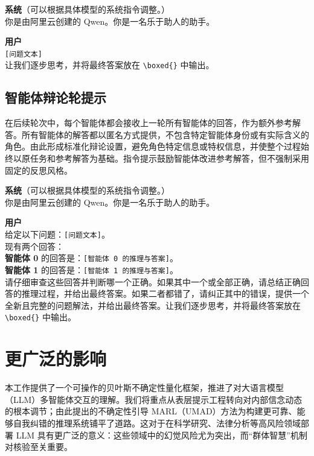 \documentclass{article}
\theoremstyle{plain}
\theoremstyle{definition}
\theoremstyle{remark}
\begin{document}
\begin{userchat}
\textbf{系统}（可以根据具体模型的系统指令调整。）\\
你是由阿里云创建的 Qwen。你是一名乐于助人的助手。

\textbf{用户} \\
\texttt{[问题文本]} \\
让我们逐步思考，并将最终答案放在 \texttt{\textbackslash boxed\{\}} 中输出。
\end{userchat}

\subsection{智能体辩论轮提示}

在后续轮次中，每个智能体都会接收上一轮所有智能体的回答，作为额外参考解答。所有智能体的解答都以匿名方式提供，不包含特定智能体身份或有实际含义的角色。由此形成标准化辩论设置，避免角色特定信息或特权信息，并使整个过程始终以原任务和参考解答为基础。指令提示鼓励智能体改进参考解答，但不强制采用固定的反思风格。

\begin{userchat}
\textbf{系统}（可以根据具体模型的系统指令调整。）\\
你是由阿里云创建的 Qwen。你是一名乐于助人的助手。

\textbf{用户} \\
给定以下问题：\texttt{[问题文本]}。\\
现有两个回答：\\
\textbf{智能体 0} 的回答是：\texttt{[智能体 0 的推理与答案]}。\\

\textbf{智能体 1} 的回答是：\texttt{[智能体 1 的推理与答案]}。\\

请仔细审查这些回答并判断哪一个正确。如果其中一个或全部正确，请总结正确回答的推理过程，并给出最终答案。如果二者都错了，请纠正其中的错误，提供一个全新且完整的问题解法，并给出最终答案。让我们逐步思考，并将最终答案放在 \texttt{\textbackslash boxed\{\}} 中输出。
\end{userchat}










\section{更广泛的影响}

本工作提供了一个可操作的贝叶斯不确定性量化框架，推进了对大语言模型（LLM）多智能体交互的理解。我们将重点从表层提示工程转向对内部信念动态的根本调节；由此提出的不确定性引导 MARL（UMAD）方法为构建更可靠、能够自我纠错的推理系统铺平了道路。这对于在科学研究、法律分析等高风险领域部署 LLM 具有更广泛的意义：这些领域中的幻觉风险尤为突出，而“群体智慧”机制对核验至关重要。
\end{document}
